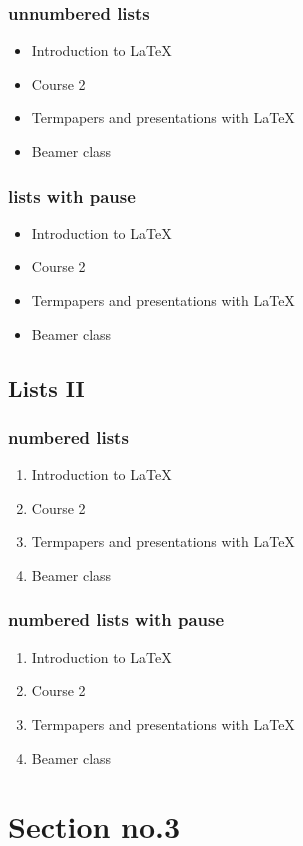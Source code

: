 \documentclass{beamer}
\begin{document}
\begin{frame}\frametitle{unnumbered lists}
  \begin{itemize}
    \item Introduction to  \LaTeX
    \item Course 2
    \item Termpapers and presentations with \LaTeX
    \item Beamer class
  \end{itemize}
\end{frame}

\begin{frame}\frametitle{lists with pause}
  \begin{itemize}
    \item Introduction to  \LaTeX \pause
    \item Course 2 \pause
    \item Termpapers and presentations with \LaTeX \pause
    \item Beamer class
  \end{itemize}
\end{frame}

\subsection{Lists II}

\begin{frame}\frametitle{numbered lists}
  \begin{enumerate}
    \item Introduction to  \LaTeX
    \item Course 2
    \item Termpapers and presentations with \LaTeX
    \item Beamer class
  \end{enumerate}
\end{frame}

\begin{frame}\frametitle{numbered lists with pause}
  \begin{enumerate}
    \item Introduction to  \LaTeX \pause
    \item Course 2 \pause
    \item Termpapers and presentations with \LaTeX \pause
    \item Beamer class
  \end{enumerate}
\end{frame}


\section{Section no.3}
\end{document}
